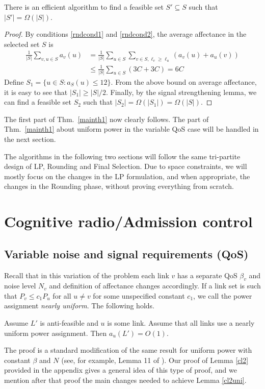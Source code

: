 \documentclass[11pt]{amsart}
\begin{document}
\begin{lemma}
There is an efficient algorithm to find a feasible set $S' \subseteq S$ such that $|S'| = \Omega(|S|)$.
\end{lemma}
\begin{proof}
By conditions \ref{rndcond1} and \ref{rndcond2},  the average
affectance in the selected set $S$ is
\begin{align*}
\frac{1}{|S|}\sum_{v, u \in S} a_v(u)
& = \frac{1}{|S|}\sum_{u \in S} \sum_{v \in S, \ell_v \geq \ell_u} 
    \left(a_v(u) + a_u(v)\right) \\
& \leq \frac{1}{|S|}\sum_{u \in S} (3C + 3C)  =  6 C
\end{align*}
Define $S_1 = \{u \in S: a_S(u) \leq 12\}$. From the above bound on average affectance, it is easy to see that $|S_1| \geq |S|/2$.
Finally, by the signal strengthening lemma, we can find a feasible set $S_2$ such that
$|S_2| = \Omega(|S_1|) = \Omega(|S|)$.
 \end{proof}
The first part of Thm.~\ref{mainth1} now clearly follows. The part of Thm.~\ref{mainth1} about uniform power in the variable QoS case will be handled in the next section.

The algorithms in the following two sections will follow the same tri-partite design of LP, Rounding and Final Selection. Due to space
constraints, we will mostly focus on the changes in the LP formulation, and when appropriate, the changes in the Rounding phase, without
proving everything from scratch.


\section{Cognitive radio/Admission control}

\subsection*{Variable noise and signal requirements (QoS)}

Recall that in this variation of the problem each link $v$ has a separate QoS $\beta_v$ and noise level $N_v$ and definition of affectance
changes accordingly.
If a link set is such that $P_v \leq c_1 P_u$ for all $u \ne v$ for some unspecified constant $c_1$, we call the 
power assignment \emph{nearly uniform}. The following holds.
\begin{lemma}
Assume $L'$ is anti-feasible and $u$ is some link. Assume that all
links use a nearly uniform power assignment. Then  $a_{u}(L') = O(1)$.
\label{cl2uni}
\end{lemma}
The proof is a standard modification of the same result for uniform
power with constant $\beta$ and $N$ (see, for example, Lemma 11 of
\cite{infocom11}).  Our proof of Lemma \ref{cl2} provided in the appendix gives a general idea
of this type of proof, and we mention after that proof the main changes needed to achieve Lemma \ref{cl2uni}.
\end{document}
